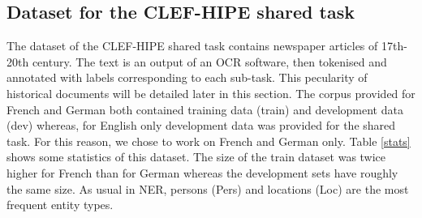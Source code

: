 \subsection{Dataset for the CLEF-HIPE shared task}
\label{sec:dataset}

The dataset of the CLEF-HIPE shared task contains newspaper articles of 17th-20th century. The text is an output of an OCR software, then tokenised and annotated with labels corresponding to each sub-task. This pecularity of historical documents will be detailed later in this section.
The corpus provided for French and German both contained training data (train) and development data (dev) whereas, for English only development data was provided for the shared task. For this reason, we chose to work on French and German only.
Table \ref{stats} shows some statistics of this dataset. The size of the train dataset was twice higher for French than for German whereas the development sets have roughly the same size. As usual in NER, persons (Pers) and locations (Loc) are the most frequent entity types.

